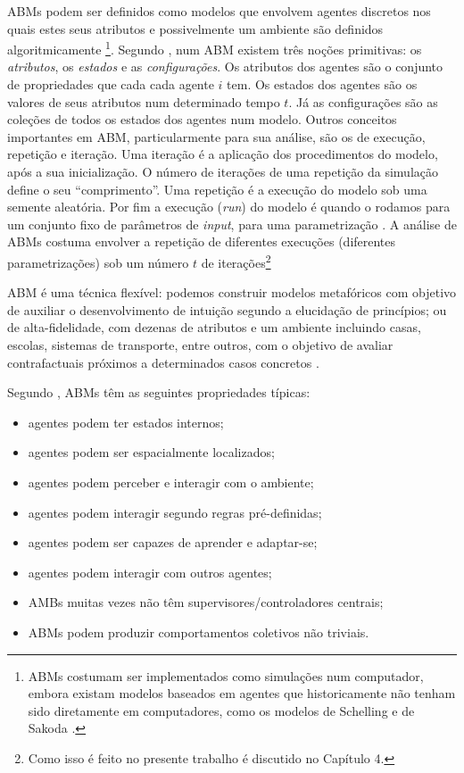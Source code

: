 ABMs podem ser definidos como modelos que envolvem agentes discretos nos quais
estes seus atributos e possivelmente um ambiente são definidos algoritmicamente
\cite{sayama2015introduction}\footnote{ ABMs costumam ser implementados como
  simulações num computador, embora existam modelos baseados em agentes que
  historicamente não tenham sido diretamente em computadores, como os modelos de
  Schelling e de Sakoda \cite{hegselmann2017thomas}.}. Segundo
, num ABM existem três noções primitivas: os
\textit{atributos}, os \textit{estados} e as \textit{configurações}. Os
atributos dos agentes são o conjunto de propriedades que cada cada agente \(i\)
tem. Os estados dos agentes são os valores de seus atributos num determinado
tempo \(t\). Já as configurações são as coleções de todos os estados dos agentes
num modelo. Outros conceitos importantes em ABM, particularmente para sua
análise, são os de execução, repetição e iteração. Uma iteração é a aplicação
dos procedimentos do modelo, após a sua inicialização. O número de iterações de
uma repetição da simulação define o seu ``comprimento''. Uma repetição é a
execução do modelo sob uma semente aleatória. Por fim a execução (\textit{run})
do modelo é quando o rodamos para um conjunto fixo de parâmetros de
\textit{input}, para uma parametrização \cite{laver2011party}. A análise de ABMs
costuma envolver a repetição de diferentes execuções (diferentes
parametrizações) sob um número \(t\) de iterações\footnote{Como isso é feito no
  presente trabalho é discutido no Capítulo 4.}

ABM é uma técnica flexível: podemos construir modelos metafóricos com objetivo
de auxiliar o desenvolvimento de intuição segundo a elucidação de princípios; ou
de alta-fidelidade, com dezenas de atributos e um ambiente incluindo casas,
escolas, sistemas de transporte, entre outros, com o objetivo de avaliar
contrafactuais próximos a determinados casos concretos \cite{de2014agent,
  epstein2006generative}.


Segundo , ABMs têm as seguintes
propriedades típicas:
\begin{itemize}
\item agentes podem ter estados internos;
\item agentes podem ser espacialmente localizados;
\item agentes podem perceber e interagir com o ambiente;
\item agentes podem interagir segundo regras pré-definidas;
\item agentes podem ser capazes de aprender e adaptar-se;
\item agentes podem interagir com outros agentes;
\item AMBs muitas vezes não têm supervisores/controladores centrais;
  \item ABMs podem produzir comportamentos coletivos não triviais.
  \end{itemize}

